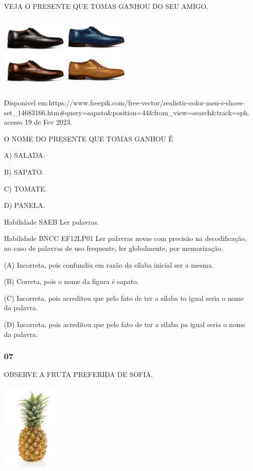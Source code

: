 VEJA O PRESENTE QUE TOMAS GANHOU DO SEU AMIGO.

\includegraphics[width=2.60694in,height=1.48889in]{media/image191.jpg}

Disponivel
em:https://www.freepik.com/free-vector/realistic-color-men-s-shoes-set\_14683166.htm\#query=sapato\&position=44\&from\_view=search\&track=sph.acesso
19 de Fev 2023.

O NOME DO PRESENTE QUE TOMAS GANHOU É

A) SALADA.

B) SAPATO.

C) TOMATE.

D) PANELA.

Habilidade SAEB Ler palavras.

Habilidade BNCC EF12LP01 Ler palavras novas com precisão na
decodificação, no caso de palavras de uso frequente, ler globalmente,
por memorização.

(A) Incorreta, pois confundiu em razão da sílaba inicial ser a mesma.

(B) Correta, pois o nome da figura é sapato.

\protect\hypertarget{_heading=h.vx1227}{}{}
(C) Incorreta, pois acreditou que pelo fato de ter a silaba to igual seria o nome da palavra.

(D) Incorreta, pois acreditou que pelo fato de ter a silaba pa igual
seria o nome da
palavra.\protect\hypertarget{_heading=h.bdexdhbfzr3s}{}{}

\subsubsection{07}\label{section-32}

OBSERVE A FRUTA PREFERIDA DE SOFIA.

\includegraphics[width=1.15208in,height=1.72708in]{media/image192.jpg}

